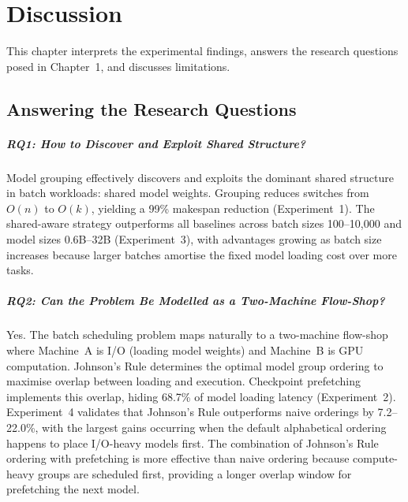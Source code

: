 \documentclass[logo,bsc,singlespacing,parskip,online]{infthesis}
\begin{document}

\chapter{Discussion}

This chapter interprets the experimental findings, answers the research questions posed in Chapter~1, and discusses limitations.

\section{Answering the Research Questions}

\paragraph{RQ1: How to Discover and Exploit Shared Structure?}

Model grouping effectively discovers and exploits the dominant shared structure in batch workloads: shared model weights. Grouping reduces switches from $O(n)$ to $O(k)$, yielding a 99\% makespan reduction (Experiment~1). The shared-aware strategy outperforms all baselines across batch sizes 100--10,000 and model sizes 0.6B--32B (Experiment~3), with advantages growing as batch size increases because larger batches amortise the fixed model loading cost over more tasks.

\paragraph{RQ2: Can the Problem Be Modelled as a Two-Machine Flow-Shop?}

Yes. The batch scheduling problem maps naturally to a two-machine flow-shop where Machine~A is I/O (loading model weights) and Machine~B is GPU computation. Johnson's Rule determines the optimal model group ordering to maximise overlap between loading and execution. Checkpoint prefetching implements this overlap, hiding 68.7\% of model loading latency (Experiment~2). Experiment~4 validates that Johnson's Rule outperforms naive orderings by 7.2--22.0\%, with the largest gains occurring when the default alphabetical ordering happens to place I/O-heavy models first. The combination of Johnson's Rule ordering with prefetching is more effective than naive ordering because compute-heavy groups are scheduled first, providing a longer overlap window for prefetching the next model.
\end{document}

